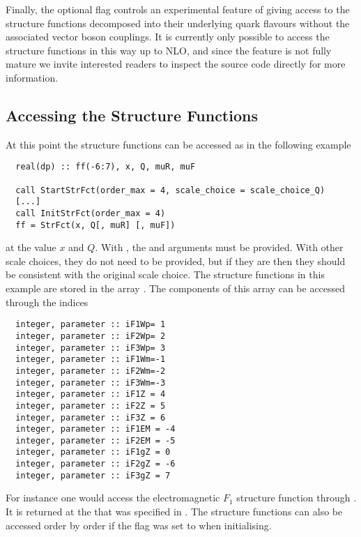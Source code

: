 Finally, the optional flag  controls an
experimental feature of giving access to the structure functions
decomposed into their underlying quark flavours without the associated
vector boson couplings. It is currently only possible to access the
structure functions in this way up to NLO, and since the feature is
not fully mature we invite interested readers to inspect the source
code directly for more information.

\subsection{Accessing the Structure Functions}
\label{sec:structure-funcs-access}
At this point the structure functions can be accessed as in the following example
\begin{lstlisting}
  real(dp) :: ff(-6:7), x, Q, muR, muF
  
  call StartStrFct(order_max = 4, scale_choice = scale_choice_Q)
  [...]
  call InitStrFct(order_max = 4)
  ff = StrFct(x, Q[, muR] [, muF])
\end{lstlisting}
at the value $x$ and $Q$.
%
With , the  and 
arguments must be provided.
%
With other scale choices, they do not need to be provided, but if they
are then they should be consistent with the original scale choice.
%
The structure functions in this example are stored in the
array . The components of this array can be accessed through
the indices
\begin{lstlisting}
  integer, parameter :: iF1Wp= 1   
  integer, parameter :: iF2Wp= 2   
  integer, parameter :: iF3Wp= 3   
  integer, parameter :: iF1Wm=-1   
  integer, parameter :: iF2Wm=-2   
  integer, parameter :: iF3Wm=-3   
  integer, parameter :: iF1Z = 4   
  integer, parameter :: iF2Z = 5   
  integer, parameter :: iF3Z = 6   
  integer, parameter :: iF1EM = -4   
  integer, parameter :: iF2EM = -5   
  integer, parameter :: iF1gZ = 0  
  integer, parameter :: iF2gZ = -6 
  integer, parameter :: iF3gZ = 7  
\end{lstlisting}
For instance one would access the electromagnetic $F_1$ structure
function through . It is returned at the 
that was specified in .
%
The structure functions can also be accessed order by order if the
 flag was set to  when initialising.
